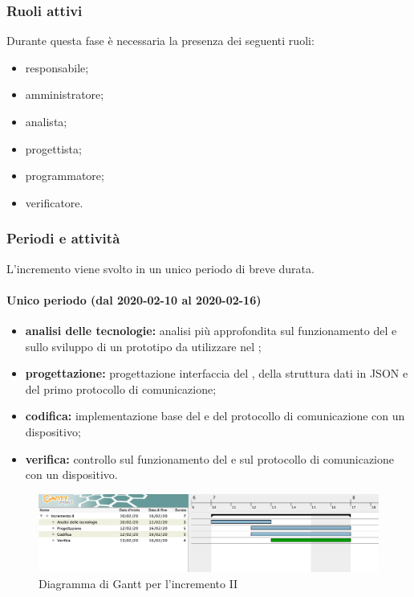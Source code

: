 			\subsubsection{Ruoli attivi}
			
				Durante questa fase è necessaria la presenza dei seguenti ruoli:
				\begin{itemize}
					\item responsabile;
					\item amministratore;
					\item analista;
					\item progettista;
					\item programmatore;
					\item verificatore.
				\end{itemize}
			
			\subsubsection{Periodi e attività}
			
				L'incremento viene svolto in un unico periodo di breve durata.
				
				\paragraph{Unico periodo (dal 2020-02-10 al 2020-02-16)}
				
					\begin{itemize}
						\item \textbf{analisi delle tecnologie:} analisi più approfondita sul funzionamento del  e sullo sviluppo di un prototipo da utilizzare nel ;	
						\item \textbf{progettazione:} progettazione interfaccia del , della struttura dati in JSON e del primo protocollo di comunicazione;
						\item \textbf{codifica:} implementazione base del  e del protocollo di comunicazione con un dispositivo;
						\item \textbf{verifica:} controllo sul funzionamento del  e sul protocollo di comunicazione con un dispositivo.
					\end{itemize} 			

		\begin{landscape}
          \begin{figure}[H]
            \centering
            \includegraphics[width=\linewidth]{images/gantt/incrementoII} %
            \caption{Diagramma di Gantt per l'incremento II}
          \end{figure}		
		\end{landscape}

